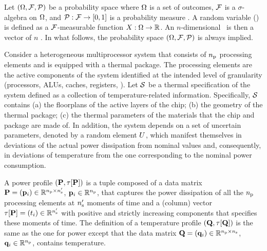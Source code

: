 Let $(\Omega, \mathcal{F}, \mathcal{P})$ be a probability space where $\Omega$ is a set of outcomes, $\mathcal{F}$ is a $\sigma$-algebra on $\Omega$, and $\mathcal{P}: \mathcal{F} \to [0, 1]$ is a probability measure \cite{durrett2010}. A random variable (\rv) is defined as a $\mathcal{F}$-measurable function $X: \Omega \to \mathbb{R}$. An $n$-dimensional \rv\ is then a vector of $n$ \rvs. In what follows, the probability space $(\Omega, \mathcal{F}, \mathcal{P})$ is always implied.

Consider a heterogeneous multiprocessor system that consists of ${n_\text{p}}$ processing elements and is equipped with a thermal package. The processing elements are the active components of the system identified at the intended level of granularity (processors, ALUs, caches, registers, \etc). Let $\mathcal{S}$ be a thermal specification of the system defined as a collection of temperature-related information. Specifically, $\mathcal{S}$ contains (a) the floorplans of the active layers of the chip; (b) the geometry of the thermal package; (c) the thermal parameters of the materials that the chip and package are made of. In addition, the system depends on a set of uncertain parameters, denoted by a random element $U$, which manifest themselves in deviations of the actual power dissipation from nominal values and, consequently, in deviations of temperature from the one corresponding to the nominal power consumption.

A power profile $\profileP$ is a tuple composed of a data matrix $\mathbf{P} = (\mathbf{p}_i) \in \mathbb{R}^{{n_\text{p}} \times {n_\text{s}'}}$, $\mathbf{p}_i \in \mathbb{R}^{n_\text{p}}$, that captures the power dissipation of all the ${n_\text{p}}$ processing elements at ${n_\text{s}'}$ moments of time and a (column) vector $\tau[\mathbf{P}] = (t_i) \in \mathbb{R}^{{n_\text{s}'}}$ with positive and strictly increasing components that specifies these moments of time. The definition of a temperature profile $\profileT$ is the same as the one for power except that the data matrix $\mathbf{Q} = (\mathbf{q}_i) \in \mathbb{R}^{{n_\text{p}} \times {n_\text{s}}}$, $\mathbf{q}_i \in \mathbb{R}^{n_\text{p}}$, contains temperature.

